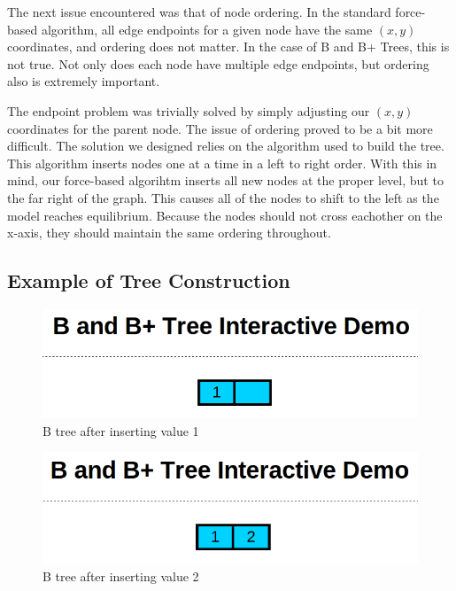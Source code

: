 The next issue encountered was that of node ordering. In the
standard force-based algorithm, all edge endpoints for a given node
have the same $(x,y)$ coordinates, and ordering does not matter. In
the case of B and B+ Trees, this is not true. Not only does each node
have multiple edge endpoints, but ordering also is extremely
important.

The endpoint problem was trivially solved by simply adjusting our
$(x,y)$ coordinates for the parent node. The issue of ordering proved
to be a bit more difficult. The solution we designed relies on the
algorithm used to build the tree. This algorithm inserts nodes one at
a time in a left to right order. With this in mind, our force-based
algorihtm inserts all new nodes at the proper level, but to the far
right of the graph. This causes all of the nodes to shift to the left
as the model reaches equilibrium. Because the nodes should not cross
eachother on the x-axis, they should maintain the same ordering throughout.

\subsection{Example of Tree Construction}

\begin{figure}[htp!]
\centering
\includegraphics[scale=0.25]{images/Insert_one.png}
\caption{B tree after inserting value 1}
\label{EX1}
\end{figure}

\begin{figure}[htp!]
\centering
\includegraphics[scale=0.25]{images/Insert_two.png}
\caption{B tree after inserting value 2}
\label{EX2}
\end{figure}

